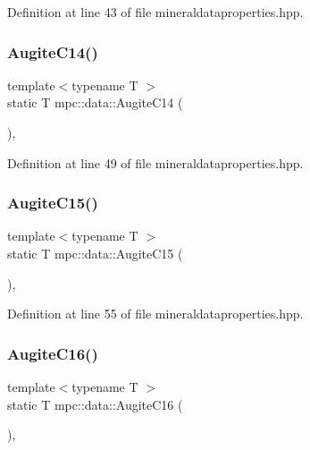 Definition at line 43 of file mineraldataproperties.\+hpp.

\mbox{\label{namespacempc_1_1data_a6b8e4e099c5214a6561cd129d13c366a}} 
\subsubsection{\texorpdfstring{Augite\+C14()}{AugiteC14()}}
{\footnotesize\ttfamily template$<$typename T $>$ \\
static T mpc\+::data\+::\+Augite\+C14 (\begin{DoxyParamCaption}{ }\end{DoxyParamCaption})\hspace{0.3cm}{\ttfamily [inline]}, {\ttfamily [static]}}



Definition at line 49 of file mineraldataproperties.\+hpp.

\mbox{\label{namespacempc_1_1data_a64fd5a22c0bc9d2a3a20a767bbe9358f}} 
\subsubsection{\texorpdfstring{Augite\+C15()}{AugiteC15()}}
{\footnotesize\ttfamily template$<$typename T $>$ \\
static T mpc\+::data\+::\+Augite\+C15 (\begin{DoxyParamCaption}{ }\end{DoxyParamCaption})\hspace{0.3cm}{\ttfamily [inline]}, {\ttfamily [static]}}



Definition at line 55 of file mineraldataproperties.\+hpp.

\mbox{\label{namespacempc_1_1data_a0a030d694b87dfef87d08230e7891264}} 
\subsubsection{\texorpdfstring{Augite\+C16()}{AugiteC16()}}
{\footnotesize\ttfamily template$<$typename T $>$ \\
static T mpc\+::data\+::\+Augite\+C16 (\begin{DoxyParamCaption}{ }\end{DoxyParamCaption})\hspace{0.3cm}{\ttfamily [inline]}, {\ttfamily [static]}}



